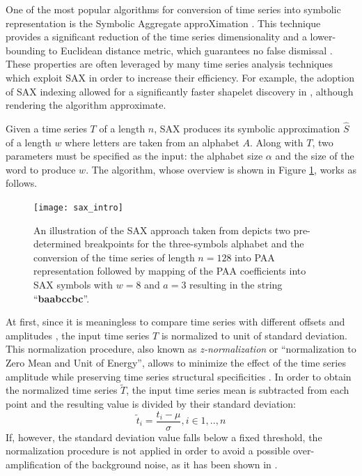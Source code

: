 One of the most popular algorithms for conversion of time series into symbolic representation is the Symbolic Aggregate approXimation \cite{sax}. 
This technique provides a significant reduction of the time series dimensionality and a lower-bounding to Euclidean distance 
metric, which guarantees no false dismissal \cite{citeulike:2821475}. 
These properties are often leveraged by many time series analysis techniques which exploit SAX in order to increase their efficiency. 
For example, the adoption of SAX indexing allowed for a significantly faster shapelet discovery in \cite{citeulike:12563493}, 
although rendering the algorithm approximate. 

Given a time series $T$ of a length $n$, SAX produces its symbolic approximation $\hat{S}$ of a length $w$ where letters are taken 
from an alphabet $A$. Along with $T$, two parameters must be specified as the input: the alphabet size $\alpha$ and the size of 
the word to produce $w$. The algorithm, whose overview is shown in Figure \ref{fig:sax_intro}, works as follows. 

\begin{figure}[tbp]
   \centering
   \texttt{[image: sax\_intro]}
   \caption[An illustration of the Symbolic Aggregate Discretization (SAX) algorithm.]
   {An illustration of the SAX approach taken from \cite{citeulike:2821475} depicts two pre-determined breakpoints for the 
   three-symbols alphabet and the conversion of the time series of length $n=128$ into PAA representation followed by mapping of 
   the PAA coefficients into SAX symbols with $w=8$ and $a=3$ resulting in the string ``\textbf{baabccbc}''.}
   \label{fig:sax_intro}
\end{figure}

At first, since it is meaningless to compare time series with different offsets and amplitudes \cite{citeulike:532340}, the input time 
series $T$ is normalized to unit of standard deviation. This normalization procedure, also known as \textit{z-normalization} or 
``normalization to Zero Mean and Unit of Energy'', allows to minimize the effect of the time series amplitude while preserving time 
series structural specificities \cite{citeulike:3815880}. In order to obtain the normalized time series $\widetilde{T}$, the 
input time series mean is subtracted from each point and the resulting value is divided by their standard deviation:
\begin{equation}
\widetilde{t}_{i} = \frac{t_{i}-\mu}{\sigma}, i \in {1,..,n}
\label{eq:znorm}
\end{equation}
If, however, the standard deviation value falls below a fixed threshold, the normalization procedure is not applied in order to avoid 
a possible over-amplification of the background noise, as it has been shown in \cite{citeulike:2821475}.


